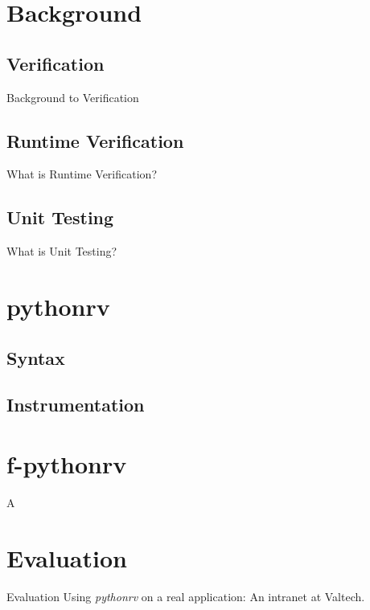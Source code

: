 \documentclass{beamer}
\begin{document}
\section{Background}

\subsection{Verification}
\begin{frame}{Background to Verification}
\end{frame}

\subsection{Runtime Verification}
\begin{frame}{What is Runtime Verification?}
\end{frame}

\subsection{Unit Testing}
\begin{frame}{What is Unit Testing?}
\end{frame}

\section{pythonrv}
\subsection{Syntax}
\subsection{Instrumentation}

\section{f-pythonrv}
\begin{frame}{A}
\end{frame}

\section{Evaluation}
\begin{frame}{Evaluation}
  Using \textit{pythonrv} on a real application: An intranet at Valtech.
\end{frame}
\end{document}
